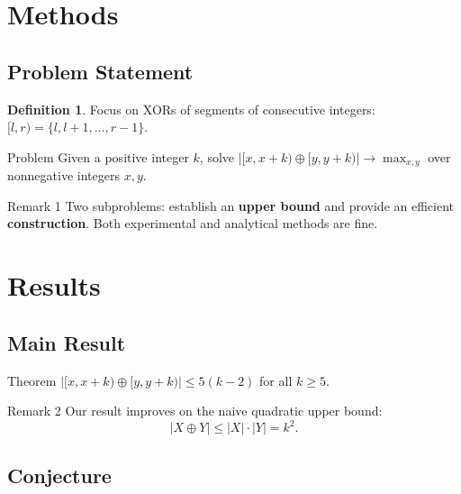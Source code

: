 \documentclass[handout,notheorems]{beamer}
\theoremstyle{definition}
\newtheorem*{definition}{Definition}
\begin{document}
\section{Methods}

\subsection{Problem Statement}

\begin{frame}
    \begin{definition}
        Focus on XORs of segments of consecutive integers: $[l, r) = \{l, l+1, \dots, r-1\}$.
    \end{definition}
    \pause
    \begin{block}{Problem}
        Given a positive integer $k$, solve $|[x, x+k) \oplus [y, y+k)| \to \max_{x,y}$ over nonnegative integers $x, y$.
    \end{block}
    \pause
    \begin{block}{Remark 1}
        Two subproblems: establish an \textbf{upper bound} and provide an efficient \textbf{construction}. Both experimental and analytical methods are fine.
    \end{block}
\end{frame}

\section{Results}

\subsection{Main Result}

\begin{frame}
    \begin{block}{Theorem}
        $|[x, x+k) \oplus [y, y+k)| \le 5(k-2)$ for all $k \ge 5$.
    \end{block}
    \pause
    \begin{block}{Remark 2}
        Our result improves on the naive quadratic upper bound:
        \begin{equation}
            |X \oplus Y| \le |X| \cdot |Y| = k^2.
        \end{equation}
    \end{block}
\end{frame}

\subsection{Conjecture}
\end{document}
